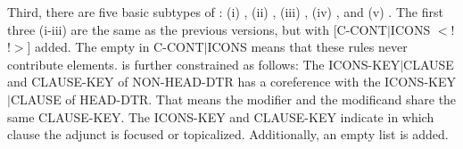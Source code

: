 


Third, there are five basic subtypes of :
(i) , (ii) ,
(iii) , (iv)
, and (v)
. The first three (i-iii) are the same
as the previous versions, but with [C-CONT{$\mid$}ICONS
  \ensuremath{<}!  !\ensuremath{>}] added.  The empty 
in \mbox{C-CONT{$\mid$}ICONS} means that these rules never contribute
 elements.   is further
constrained as follows: The ICONS-KEY{$\mid$}CLAUSE and
CLAUSE-KEY of NON-HEAD-DTR has a coreference with the
ICONS-KEY{$\mid$}CLAUSE of HEAD-DTR. That
means the modifier and the modificand share the same CLAUSE-KEY. The
ICONS-KEY and CLAUSE-KEY indicate in which clause the adjunct is
focused or topicalized.  Additionally, an empty  list is
added.




